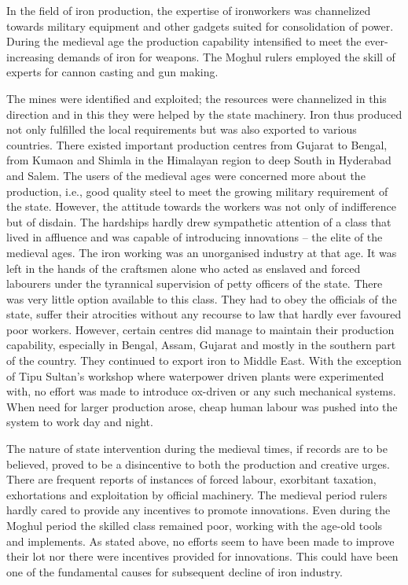 In the field of iron production, the expertise of ironworkers was channelized towards military equipment and other gadgets suited for consolidation of power. During the medieval age the production capability intensified to meet the ever-increasing demands of iron for weapons. The Moghul rulers employed the skill of experts for cannon casting and gun making.

\newpage

The mines were identified and exploited; the resources were channelized in this direction and in this they were helped by the state machinery. Iron thus produced not only fulfilled the local requirements but was also exported to various countries. There existed important production centres from Gujarat to Bengal, from Kumaon and Shimla in the Himalayan region to deep South in Hyderabad and Salem. The users of the medieval ages were concerned more about the production, i.e., good quality steel to meet the growing military requirement of the state. However, the attitude towards the workers was not only of indifference but of disdain. The hardships hardly drew sympathetic attention of a class that lived in affluence and was capable of introducing innovations – the elite of the medieval ages. The iron working was an unorganised industry at that age. It was left in the hands of the craftsmen alone who acted as enslaved and forced labourers under the tyrannical supervision of petty officers of the state. There was very little option available to this class. They had to obey the officials of the state, suffer their atrocities without any recourse to law that hardly ever favoured poor workers. However, certain centres did manage to maintain their production capability, especially in Bengal, Assam, Gujarat and mostly in the southern part of the country. They continued to export iron to Middle East. With the exception of Tipu Sultan's workshop where waterpower driven plants were experimented with, no effort was made to introduce ox-driven or any such mechanical systems. When need for larger production arose, cheap human labour was pushed into the system to work day and night. 

The nature of state intervention during the medieval times, if records are to be believed, proved to be a disincentive to both the production and creative urges. There are frequent reports of instances of forced labour, exorbitant taxation, exhortations and exploitation by official machinery. The medieval period rulers hardly cared to provide any incentives to promote innovations. Even during the Moghul period the skilled class remained poor, working with the age-old tools and implements. As stated above, no efforts seem to have been made to improve their lot nor there were incentives provided for innovations. This could have been one of the fundamental causes for subsequent decline of iron industry.

